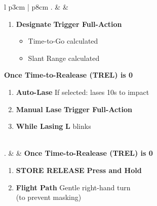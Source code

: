 \documentclass[8pt,usenames,dvipsnames,twoside]{article}
\begin{document}
\begin{center}
\begin{longtable}{l p{3cm} | p{8cm}}
				. &  & 
				\begin{minipage}[t]{\linewidth}
					\vspace{-7pt}
					\begin{enumerate}[label=(\alph*)]
						\item \textbf{Designate} \dotfill \textbf{Trigger Full-Action}
						\begin{itemize}
							\item Time-to-Go calculated
							\item Slant Range calculated
						\end{itemize}
					\end{enumerate}
					\textbf{Once Time-to-Realease (TREL) is 0}
					\begin{enumerate}[label=(\alph*), resume]
						\item \textbf{Auto-Lase} \dotfill If selected: lases 10s to impact
						\item \textbf{Manual Lase} \dotfill \textbf{Trigger Full-Action}
						\item \textbf{While Lasing} \dotfill \textbf{L} blinks
					\end{enumerate}
				\end{minipage} \\
				. &  & \textbf{Once Time-to-Realease (TREL) is 0}
				\begin{minipage}[t]{\linewidth}
					\vspace{-7pt}
					\begin{enumerate}[label=(\alph*)]
						\item \textbf{STORE RELEASE} \dotfill \textbf{Press and Hold}
						\item \textbf{Flight Path} \dotfill Gentle right-hand turn \\
						\hfill (to prevent masking)
					\end{enumerate}
				\end{minipage} \\
				\bottomrule
			\end{longtable}
		\end{center}
	
\end{document}
